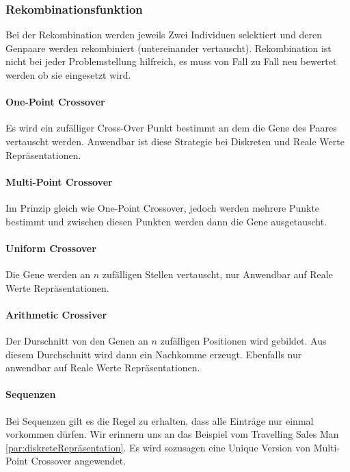     \subsubsection{Rekombinationsfunktion}
        Bei der Rekombination werden jeweils Zwei Individuen selektiert und deren Genpaare werden rekombiniert (untereinander vertauscht).
        Rekombination ist nicht bei jeder Problemstellung hilfreich, es muss von Fall zu Fall neu bewertet werden ob sie eingesetzt wird.

        \paragraph{One-Point Crossover}
          Es wird ein zufälliger Cross-Over Punkt bestimmt an dem die Gene des Paares vertauscht werden.
          Anwendbar ist diese Strategie bei Diskreten und Reale Werte Repräsentationen.

        \paragraph{Multi-Point Crossover}
          Im Prinzip gleich wie One-Point Crossover, jedoch werden mehrere Punkte bestimmt und
          zwischen diesen Punkten werden dann die Gene ausgetauscht.

        \paragraph{Uniform Crossover}
          Die Gene werden an \(n\) zufälligen Stellen vertauscht, nur Anwendbar auf Reale Werte Repräsentationen.

        \paragraph{Arithmetic Crossiver}
          Der Durschnitt von den Genen an \(n\) zufälligen Positionen wird gebildet.
          Aus diesem Durchschnitt wird dann ein Nachkomme erzeugt.
          Ebenfalls nur anwendbar auf Reale Werte Repräsentationen.

        \paragraph{Sequenzen}
          Bei Sequenzen gilt es die Regel zu erhalten, dass alle Einträge nur einmal vorkommen dürfen. Wir erinnern uns an das Beispiel vom Travelling Sales Man \ref{par:diskreteRepräsentation}.
          Es wird sozusagen eine Unique Version von  Multi-Point Crossover angewendet.

